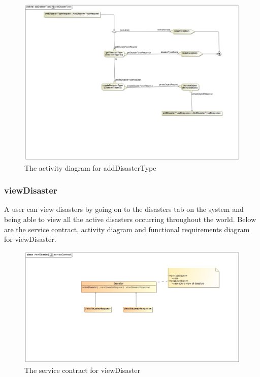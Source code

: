 \begin{figure}[H]
	\centering
	\includegraphics[width=1.0\textwidth]{../images/addDisasterTypeActivityDiagram.jpg}
	\caption{The activity diagram for addDisasterType \label{overflow}}
\end{figure}

\subsubsection{viewDisaster}

A user can view disasters by going on to the disasters tab on the system and being able to view all the active disasters occurring throughout the world. Below are the service contract, activity diagram and functional requirements diagram for viewDisaster.

\begin{figure}[H]
	\centering
	\includegraphics[width=1.0\textwidth]{../images/viewDisasterServiceContract.jpg}
	\caption{The service contract for viewDisaster \label{overflow}}
\end{figure}

